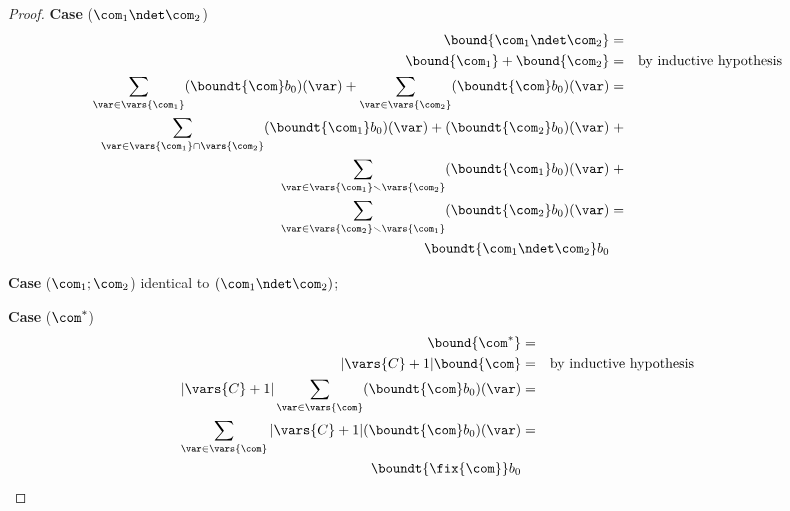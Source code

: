 \begin{proof}
  \textbf{Case} (\(\com_1 \ndet \com_2\))
  \begin{align*}
    \bound{\com_1 \ndet \com_2} & = &\\
    \bound{\com_1} + \bound{\com_2} & = & \text{by inductive hypothesis}\\
      \sum_{\var\in \vars{\com_1}} (\boundt{\com}b_0)(\var) + \sum_{\var\in \vars{\com_2}} (\boundt{\com}b_0)(\var) & = &\\
    \sum_{\var\in \vars{\com_1}\cap \vars{\com_2}} (\boundt{\com_1}b_0)(\var)+(\boundt{\com_2}b_0)(\var) & \;+ & \\
    \sum_{\var\in \vars{\com_1}\smallsetminus \vars{\com_2}} (\boundt{\com_1}b_0)(\var) & \;+ & \\
    \sum_{\var\in \vars{\com_2}\smallsetminus \vars{\com_1}} (\boundt{\com_2}b_0)(\var) & = & \\
    \boundt{\com_1 \ndet \com_2}b_0 & &
  \end{align*}

  \medskip
  
  \textbf{Case} (\(\com_1 ; \com_2\))
  identical to \((\com_1 \ndet \com_2)\);

  \medskip
  
  \textbf{Case} (\(\com^*\))
  \begin{align*}
    \bound{\com^*} & = &\\
    |\vars{C}+1|\bound{\com} & = & \text{by inductive hypothesis} \\
    |\vars{C}+1|\sum_{\var\in \vars{\com}} (\boundt{\com}b_0)(\var) & = &\\
    \sum_{\var\in \vars{\com}} |\vars{C}+1|(\boundt{\com}b_0)(\var) & = &\\
      \boundt{\fix{\com}}b_0 & &
  \end{align*}
\end{proof}
